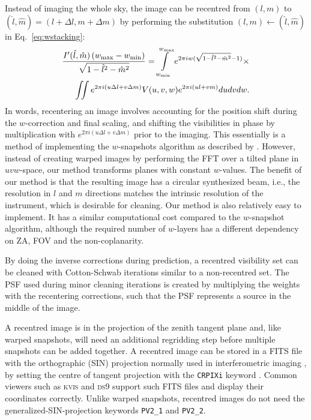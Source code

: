 \documentclass[useAMS,usenatbib]{mn2e}
\begin{document}
Instead of imaging the whole sky, the image can be recentred from $(l,m)$ to $(\hat{l},\hat{m})=(l+\Delta l,m+\Delta m)$ by performing the substitution $(l,m)\leftarrow(\hat{l},\hat{m})$ in Eq.~\eqref{eq:wstacking}:
\begin{align}\notag
\frac{I'(\hat{l}, \hat{m})\left(w_{\max} - w_{\min}\right)}{\sqrt{1-\hat{l}^2-\hat{m}^2}} = \int\limits_{w_{\min}}^{w_{\max}} e^{2\pi i w(\sqrt{1-\hat{l}^2-\hat{m}^2}-1)} \times \\
\iint e^{2 \pi i \left(u\Delta l + v\Delta m\right)} V(u,v,w) e^{2\pi i \left(ul + vm\right)} du dv dw.
\end{align}
In words, recentering an image involves accounting for the position shift during the $w$-correction and final scaling, and shifting the visibilities in phase by multiplication with $e^{2 \pi i \left(u\Delta l + v\Delta m\right)}$ prior to the imaging. This essentially is a method of implementing the $w$-snapshots algorithm as described by \citet{widefield-imaging-ska-cornwell}. However, instead of creating warped images by performing the FFT over a tilted plane in $uvw$-space, our method transforms planes with constant $w$-values. The benefit of our method is that the resulting image has a circular synthesized beam, i.e., the resolution in $l$ and $m$ directions matches the intrinsic resolution of the instrument, which is desirable for cleaning. Our method is also relatively easy to implement. It has a similar computational cost compared to the $w$-snapshot algorithm, although the required number of $w$-layers has a different dependency on ZA, FOV and the non-coplanarity.

By doing the inverse corrections during prediction, a recentred visibility set can be cleaned with Cotton-Schwab iterations similar to a non-recentred set. The PSF used during minor cleaning iterations is created by multiplying the weights with the recentering corrections, such that the PSF represents a source in the middle of the image.

A recentred image is in the projection of the zenith tangent plane and, like warped snapshots, will need an additional regridding step before multiple snapshots can be added together. A recentred image can be stored in a FITS file with the orthographic (SIN) projection normally used in interferometric imaging \citep{fits-coordinates-2002}, by setting the centre of tangent projection with the \texttt{CRPIXi} keyword \citep{wcs-in-fits}. Common viewers such as \textsc{kvis} \citep{karma-1996} and \textsc{ds9} support such FITS files and display their coordinates correctly. Unlike warped snapshots, recentred images do not need the generalized-SIN-projection keywords \texttt{PV2\_1} and \texttt{PV2\_2}.
\end{document}

